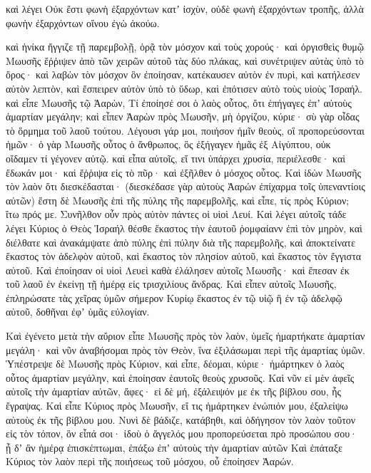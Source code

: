 {καὶ λέγει Οὐκ ἔστι φωνὴ ἐξαρχόντων κατʼ ἰσχὺν, οὐδὲ φωνὴ ἐξαρχόντων τροπῆς, ἀλλὰ φωνὴν ἐξαρχόντων οἴνου ἐγὼ ἀκούω.
\par }{\PP {}καὶ ἡνίκα ἤγγιζε τῇ παρεμβολῇ, ὁρᾷ τὸν μόσχον καὶ τοὺς χορούς· καὶ ὀργισθεὶς θυμῷ Μωυσῆς ἔῤῥιψεν ἀπὸ τῶν χειρῶν αὐτοῦ τὰς δύο πλάκας, καὶ συνέτριψεν αὐτὰς ὑπὸ τὸ ὄρος·
καὶ λαβὼν τὸν μόσχον ὃν ἐποίησαν, κατέκαυσεν αὐτὸν ἐν πυρὶ, καὶ κατήλεσεν αὐτὸν λεπτὸν, καὶ ἔσπειρεν αὐτὸν ὑπὸ τὸ ὕδωρ, καὶ ἐπότισεν αὐτὸ τοὺς υἱοὺς Ἰσραήλ.
καὶ εἶπε Μωυσῆς τῷ Ἀαρὼν, Τί ἐποίησέ σοι ὁ λαὸς οὗτος, ὅτι ἐπήγαγες ἐπʼ αὐτοὺς ἁμαρτίαν μεγάλην;
καὶ εἶπεν Ἀαρὼν πρὸς Μωυσῆν, μὴ ὀργίζου, κύριε· σὺ γὰρ οἶδας τὸ ὅρμημα τοῦ λαοῦ τούτου.
Λέγουσι γάρ μοι, ποιήσον ἡμῖν θεοὺς, οἳ προπορεύσονται ἡμῶν· ὁ γὰρ Μωυσῆς οὗτος ὁ ἄνθρωπος, ὃς ἐξήγαγεν ἡμᾶς ἐξ Αἰγύπτου, οὐκ οἴδαμεν τί γέγονεν αὐτῷ.
καὶ εἶπα αὐτοῖς, εἴ τινι ὑπάρχει χρυσία, περιέλεσθε· καὶ ἔδωκάν μοι· καὶ ἔῤῥιψα εἰς τὸ πῦρ· καὶ ἐξῆλθεν ὁ μόσχος οὗτος.
Καὶ ἰδὼν Μωυσῆς τὸν λαὸν ὅτι διεσκέδασται· (διεσκέδασε γὰρ αὐτοὺς Ἀαρών ἐπίχαρμα τοῖς ὑπεναντίοις αὐτῶν)
ἔστη δὲ Μωυσῆς ἑπὶ τῆς πύλης τῆς παρεμβολῆς, καὶ εἶπε, τίς πρὸς Κύριον; ἴτω πρός με. Συνῆλθον οὖν πρὸς αὐτὸν πάντες οἱ υἱοὶ Λευί.
Καὶ λέγει αὐτοῖς τάδε λέγει Κύριος ὁ Θεὸς Ἰσραήλ θέσθε ἕκαστος τὴν ἑαυτοῦ ῥομφαίανν ἐπὶ τὸν μηρὸν, καὶ διέλθατε καὶ ἀνακάμψατε ἀπὸ πύλης ἐπὶ πύλην διὰ τῆς παρεμβολῆς, καὶ ἀποκτείνατε ἕκαστος τὸν ἀδελφὸν αὐτοῦ, καὶ ἕκαστος τὸν πλησίον αὐτοῦ, καὶ ἓκαστος τὸν ἔγγιστα αὐτοῦ.
Καὶ ἐποίησαν οἱ υἱοὶ Λευεὶ καθὰ ἐλάλησεν αὐτοῖς Μωυσῆς· καὶ ἔπεσαν ἐκ τοῦ λαοῦ ἐν ἐκείνῃ τῇ ἡμέρᾳ εἰς τρισχιλίους ἄνδρας.
Καὶ εἶπεν αὐτοῖς Μωυσῆς, ἐπληρώσατε τὰς χεῖρας ὑμῶν σήμερον Κυρίῳ ἕκαστος ἐν τῷ υἱῷ ἢ ἐν τῷ ἀδελφῷ αὐτοῦ, δοθῆναι ἐφʼ ὑμᾶς εὐλογίαν.
\par }{\PP {}Καὶ ἐγένετο μετὰ τὴν αὔριον εἶπε Μωυσῆς πρὸς τὸν λαὸν, ὑμεῖς ἡμαρτήκατε ἁμαρτίαν μεγάλη· καὶ νῦν ἀναβήσομαι πρὸς τὸν Θεὸν, ἵνα ἐξιλάσωμαι περὶ τῆς ἁμαρτίας ὑμῶν.
Ὑπέστρεψε δὲ Μωυσῆς πρὸς Κύριον, καὶ εἶπε, δέομαι, κύριε· ἡμάρτηκεν ὁ λαὸς οὗτος ἁμαρτίαν μεγάλην, καὶ ἐποίησαν ἑαυτοῖς θεοὺς χρυσοῦς.
Καὶ νῦν εἰ μὲν ἀφεῖς αὐτοῖς τὴν ἁμαρτίαν αὐτῶν, ἄφες· εἰ δὲ μή, ἐξάλειψόν με ἐκ τῆς βίβλου σου, ἧς ἔγραψας.
Καὶ εἶπε Κύριος πρὸς Μωυσῆν, εἴ τις ἡμάρτηκεν ἐνώπιόν μου, ἐξαλείψω αὐτοὺς ἐκ τῆς βίβλου μου.
Νυνὶ δὲ βάδιζε, κατάβηθι, καὶ ὁδήγησον τὸν λαὸν τοῦτον εἰς τὸν τόπον, ὃν εἶπά σοι· ἰδοὺ ὁ ἄγγελός μου προπορεύσεται πρὸ προσώπου σου· ᾖ δʼ ἂν ἡμέρᾳ ἐπισκέπτωμαι, ἐπάξω ἐπʼ αὐτοὺς τὴν ἁμαρτίαν αὐτῶν
Καὶ ἐπάταξε Κύριος τὸν λαὸν περὶ τῆς ποιήσεως τοῦ μόσχου, οὗ ἐποίησεν Ἀαρών.

}

